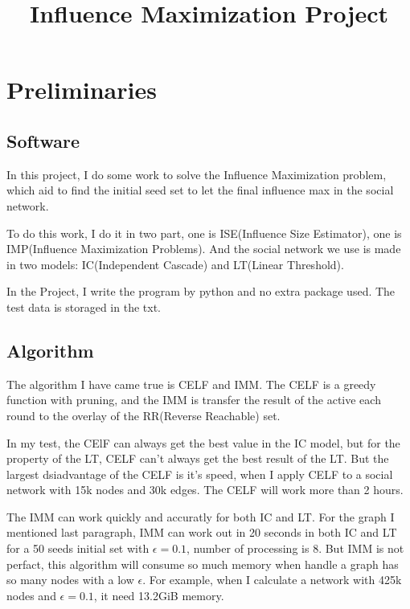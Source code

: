 \documentclass[conference,compsoc]{IEEEtran}
\begin{document}
\title{Influence Maximization Project}
\author{
}
\maketitle
\IEEEpeerreviewmaketitle 



\section{Preliminaries}
  \subsection{Software}
    In this project, I do some work to solve the Influence Maximization problem, which aid to find the initial seed set to let the final influence max in the social network.

    To do this work, I do it in two part, one is ISE(Influence Size Estimator), one is IMP(Influence Maximization Problems). And the social network we use is made in two models: IC(Independent Cascade) and LT(Linear Threshold).

    In the Project, I write the program by python and no extra package used. The test data is storaged in the txt. 

  \subsection{Algorithm}
    The algorithm I have came true is CELF and IMM. 
    The CELF is a greedy function with pruning, and the IMM is transfer the result of the active each round to the overlay of the RR(Reverse Reachable) set.
    
    In my test, the CElF can always get the best value in the IC model, but for the property of the LT, CELF can't always get the best result of the LT. But the largest dsiadvantage of the CELF is it's speed, when I apply CELF to a social network with 15k nodes and 30k edges. The CELF will work more than 2 hours.

    The IMM can work quickly and accuratly for both IC and LT. For the graph I mentioned last paragraph, IMM can work out in 20 seconds in both IC and LT for a 50 seeds initial set with $\epsilon = 0.1$, number of processing is 8.
    But IMM is not perfact, this algorithm will consume so much memory when handle a graph has so many nodes with a low $\epsilon$. For example, when I calculate a network with 425k nodes and $\epsilon = 0.1$, it need 13.2GiB memory.
    
\end{document}
